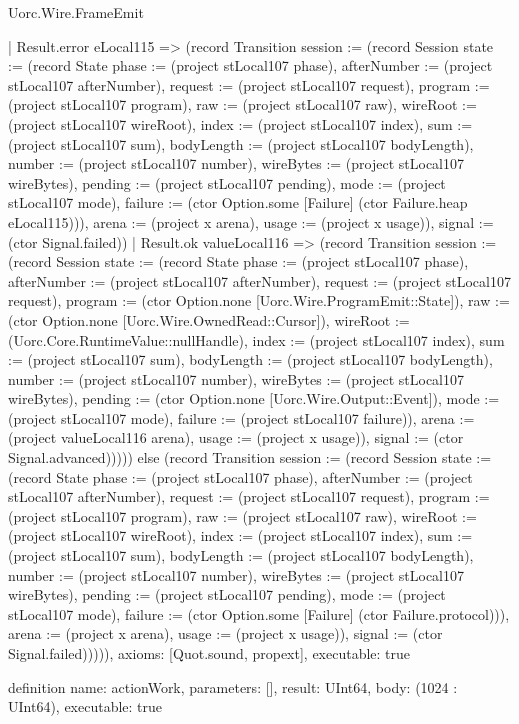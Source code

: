 \begin{lexlean}{Uorc.Wire.FrameEmit}
\begin{semanticmodule}
{      | Result.error eLocal115 => (record Transition {session := (record Session {state := (record State {phase := (project stLocal107 phase), afterNumber := (project stLocal107 afterNumber), request := (project stLocal107 request), program := (project stLocal107 program), raw := (project stLocal107 raw), wireRoot := (project stLocal107 wireRoot), index := (project stLocal107 index), sum := (project stLocal107 sum), bodyLength := (project stLocal107 bodyLength), number := (project stLocal107 number), wireBytes := (project stLocal107 wireBytes), pending := (project stLocal107 pending), mode := (project stLocal107 mode), failure := (ctor Option.some [Failure] (ctor Failure.heap eLocal115))}), arena := (project x arena), usage := (project x usage)}), signal := (ctor Signal.failed)})
      | Result.ok valueLocal116 => (record Transition {session := (record Session {state := (record State {phase := (project stLocal107 phase), afterNumber := (project stLocal107 afterNumber), request := (project stLocal107 request), program := (ctor Option.none [Uorc.Wire.ProgramEmit::State]), raw := (ctor Option.none [Uorc.Wire.OwnedRead::Cursor]), wireRoot := (Uorc.Core.RuntimeValue::nullHandle), index := (project stLocal107 index), sum := (project stLocal107 sum), bodyLength := (project stLocal107 bodyLength), number := (project stLocal107 number), wireBytes := (project stLocal107 wireBytes), pending := (ctor Option.none [Uorc.Wire.Output::Event]), mode := (project stLocal107 mode), failure := (project stLocal107 failure)}), arena := (project valueLocal116 arena), usage := (project x usage)}), signal := (ctor Signal.advanced)})))) else (record Transition {session := (record Session {state := (record State {phase := (project stLocal107 phase), afterNumber := (project stLocal107 afterNumber), request := (project stLocal107 request), program := (project stLocal107 program), raw := (project stLocal107 raw), wireRoot := (project stLocal107 wireRoot), index := (project stLocal107 index), sum := (project stLocal107 sum), bodyLength := (project stLocal107 bodyLength), number := (project stLocal107 number), wireBytes := (project stLocal107 wireBytes), pending := (project stLocal107 pending), mode := (project stLocal107 mode), failure := (ctor Option.some [Failure] (ctor Failure.protocol))}), arena := (project x arena), usage := (project x usage)}), signal := (ctor Signal.failed)})))),
  axioms: [Quot.sound, propext],
  executable: true
}

definition{
  name: actionWork,
  parameters: [],
  result: UInt64,
  body: (1024 : UInt64),
  executable: true
}


\end{semanticmodule}
\end{lexlean}
